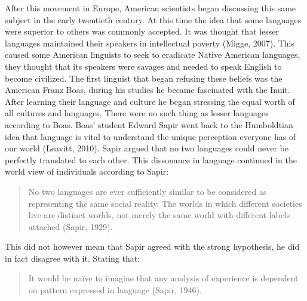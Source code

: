 After this movement in Europe, American scientists began discussing this same subject in the early twentieth century. At this time the idea that some languages were superior to others was commonly accepted. It was thought that lesser languages maintained their speakers in intellectual poverty (Migge, 2007). This caused some American linguists to seek to eradicate Native American languages, they thought that its speakers were savages and needed to speak English to become civilized. The first linguist that began refusing these beliefs was the American Franz Boas, during his studies he became fascinated with the Inuit. After learning their language and culture he began stressing the equal worth of all cultures and languages. There were no such thing as lesser languages according to Boas. Boas’ student Edward Sapir went back to the Humboldtian idea that language is vital to understand the unique perception everyone has of our world (Leavitt, 2010). Sapir argued that no two languages could never be perfectly translated to each other. This dissonance in language continued in the world view of individuals according to Sapir: 

\begin{quote}
\begin{singlespace}
	No two languages are ever sufficiently similar to be considered as representing the same social reality. The worlds in which different societies live are distinct worlds, not merely the same world with different labels attached (Sapir, 1929).
\end{singlespace}
\end{quote}

This did not however mean that Sapir agreed with the strong hypothesis, he did in fact disagree with it. Stating that: 

\begin{quote}
\begin{singlespace}
	It would be naïve to imagine that any analysis of experience is dependent on pattern expressed in language (Sapir, 1946).
\end{singlespace}
\end{quote}

